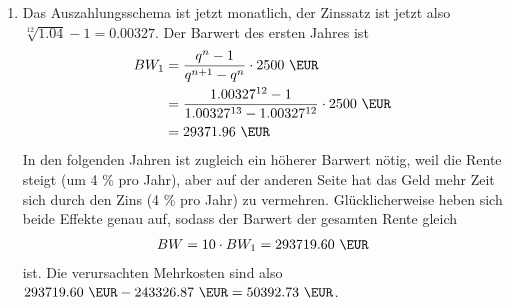 \documentclass{article}
\begin{document}
\begin{enumerate}[label=(\alph*)]
		\item Das Auszahlungsschema ist jetzt monatlich, der Zinssatz ist jetzt also $\sqrt[12]{1.04}-1=0.00327$. Der Barwert des ersten Jahres ist
		\begin{align}
			BW_1 &= \frac{q^n-1}{q^{n+1}-q^n} \cdot 2500 \text{ \EUR} \notag \\
			&= \frac{1.00327^{12}-1}{1.00327^{13}-1.00327^{12}} \cdot 2500 \text{ \EUR} \notag \\
			&= 29371.96 \text{ \EUR} \notag
		\end{align}
		In den folgenden Jahren ist zugleich ein höherer Barwert nötig, weil die Rente steigt (um 4 \% pro Jahr), aber auf der anderen Seite hat das Geld mehr Zeit sich durch den Zins (4 \% pro Jahr) zu vermehren. Glücklicherweise heben sich beide Effekte genau auf, sodass der Barwert der gesamten Rente gleich
		\begin{align}
			BW = 10 \cdot BW_1 = 293719.60 \text{ \EUR} \notag
		\end{align}
		ist. Die verursachten Mehrkosten sind also $293719.60 \text{ \EUR} - 243326.87 \text{ \EUR} = 50392.73 \text{ \EUR}$.
	\end{enumerate}
	
	
\end{document}
